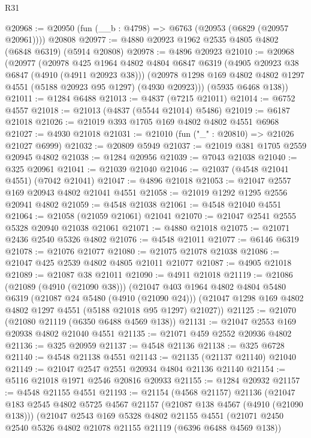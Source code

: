 \begin{lexlean}{R31}
\begin{coremodule}
@20968 := @20950 (fun (__b : @4798) => @6763 (@20953 (@6829 (@20957 @20961)))) @20808
@20977 := @4880 @20923 @1962 @2535 @4805 @4802 (@6848 @6319) (@5914 @20808)
@20978 := @4896 @20923
@21010 := @20968
    (@20977
      (@20978
        @425
        @1964
        @4802
        @4804
        @6847
        @6319
        (@4905 @20923 @38 @6847 (@4910 (@4911 @20923 @38)))
        (@20978 @1298 @169 @4802 @4802 @1297 @4551 (@5188 @20923 @95 @1297) (@4930 @20923)))
      (@5935 @6468 @138))
@21011 := @1284 @6488
@21013 := @4837 (@7215 @21011)
@21014 := @6752 @4557
@21018 := @21013 (@4837 (@5544 @21014) @5486)
@21019 := @6187 @21018
@21026 := @21019 @393 @1705 @169 @4802 @4802 @4551 @6968
@21027 := @4930 @21018
@21031 := @21010 (fun ("_" : @20810) => @21026 @21027 @6999)
@21032 := @20809 @5949
@21037 := @21019 @381 @1705 @2559 @20945 @4802
@21038 := @1284 @20956
@21039 := @7043 @21038
@21040 := @325 @20961
@21041 := @21039 @21040
@21046 := @21037 (@4548 @21041 @4551) (@7042 @21041)
@21047 := @4896 @21018
@21053 := @21047 @2557 @169 @20943 @4802 @21041 @4551
@21058 := @21019 @1292 @1295 @2556 @20941 @4802
@21059 := @4548 @21038
@21061 := @4548 @21040 @4551
@21064 := @21058 (@21059 @21061) @21041
@21070 := @21047 @2541 @2555 @5328 @20940 @21038 @21061
@21071 := @4880 @21018
@21075 := @21071 @2436 @2540 @5326 @4802
@21076 := @4548 @21011
@21077 := @6146 @6319
@21078 := @21076 @21077
@21080 := @21075 @21078 @21038
@21086 := @21047 @425 @2539 @4802 @4805 @21011 @21077
@21087 := @4905 @21018
@21089 := @21087 @38 @21011
@21090 := @4911 @21018
@21119 := @21086
    (@21089 (@4910 (@21090 @38)))
    (@21047
      @403
      @1964
      @4802
      @4804
      @5480
      @6319
      (@21087 @24 @5480 (@4910 (@21090 @24)))
      (@21047 @1298 @169 @4802 @4802 @1297 @4551 (@5188 @21018 @95 @1297) @21027))
@21125 := @21070 (@21080 @21119 (@6350 @6488 @4569 @138))
@21131 := @21047 @2553 @169 @20938 @4802 @21040 @4551
@21135 := @21071 @459 @2552 @20936 @4802
@21136 := @325 @20959
@21137 := @4548 @21136
@21138 := @325 @6728
@21140 := @4548 @21138 @4551
@21143 := @21135 (@21137 @21140) @21040
@21149 := @21047 @2547 @2551 @20934 @4804 @21136 @21140
@21154 := @5116 @21018 @1971 @2546 @20816 @20933
@21155 := @1284 @20932
@21157 := @4548 @21155 @4551
@21193 := @21154
    (@4568 @21157)
    @21136
    (@21047
      @183
      @2545
      @4802
      @5725
      @4567
      @21157
      (@21087 @138 @4567 (@4910 (@21090 @138)))
      (@21047
        @2543
        @169
        @5328
        @4802
        @21155
        @4551
        (@21071 @2450 @2540 @5326 @4802 @21078 @21155 @21119 (@6396 @6488 @4569 @138))

\end{coremodule}
\end{lexlean}
